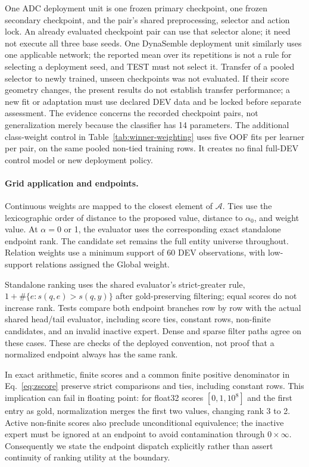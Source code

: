 \documentclass[11pt,a4paper]{article}
\newcommand{\Agrid}{\mathcal{A}}
\begin{document}
One ADC deployment unit is one frozen primary checkpoint, one frozen secondary checkpoint, and the pair's shared preprocessing, selector and action lock. An already evaluated checkpoint pair can use that selector alone; it need not execute all three base seeds. One DynaSemble deployment unit similarly uses one applicable network; the reported mean over its repetitions is not a rule for selecting a deployment seed, and TEST must not select it. Transfer of a pooled selector to newly trained, unseen checkpoints was not evaluated. If their score geometry changes, the present results do not establish transfer performance; a new fit or adaptation must use declared DEV data and be locked before separate assessment. The evidence concerns the recorded checkpoint pairs, not generalization merely because the classifier has 14 parameters.
The additional class-weight control in Table~\ref{tab:winner-weighting} uses five OOF fits per learner per pair, on the same pooled non-tied training rows. It creates no final full-DEV control model or new deployment policy.

\FloatBarrier



\paragraph{Grid application and endpoints.}
\label{app:endpoint-contract}
Continuous weights are mapped to the closest element of $\Agrid$. Ties use the lexicographic order of distance to the proposed value, distance to $\alpha_0$, and weight value. At $\alpha=0$ or 1, the evaluator uses the corresponding exact standalone endpoint rank. The candidate set remains the full entity universe throughout. Relation weights use a minimum support of 60 DEV observations, with low-support relations assigned the Global weight.

Standalone ranking uses the shared evaluator's strict-greater rule, $1+\#\{e:s(q,e)>s(q,y)\}$ after gold-preserving filtering; equal scores do not increase rank. Tests compare both endpoint branches row by row with the actual shared head/tail evaluator, including score ties, constant rows, non-finite candidates, and an invalid inactive expert. Dense and sparse filter paths agree on these cases. These are checks of the deployed convention, not proof that a normalized endpoint always has the same rank.

In exact arithmetic, finite scores and a common finite positive denominator in Eq.~\eqref{eq:zscore} preserve strict comparisons and ties, including constant rows. This implication can fail in floating point: for float32 scores $[0,1,10^8]$ and the first entry as gold, normalization merges the first two values, changing rank 3 to 2. Active non-finite scores also preclude unconditional equivalence; the inactive expert must be ignored at an endpoint to avoid contamination through $0\times\infty$. Consequently we state the endpoint dispatch explicitly rather than assert continuity of ranking utility at the boundary.
\end{document}
